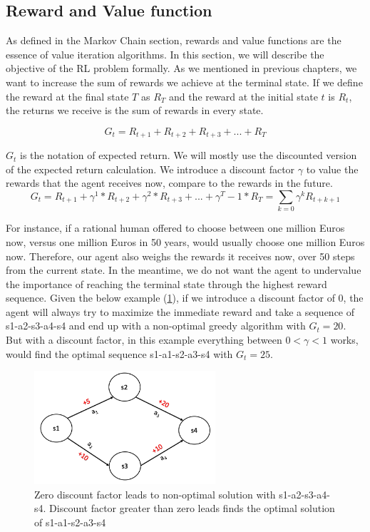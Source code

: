 \subsection{Reward and Value function}

As defined in the Markov Chain section, rewards and value functions are the essence of value iteration algorithms. In this section, we will describe the objective of the RL problem formally. As we mentioned in previous chapters, we want to increase the sum of rewards we achieve at the terminal state. If we define the reward at the final state \(T\) as \(R_T\) and the reward at the initial state \(t\) is \(R_t\), the returns we receive is the sum of rewards in every state.

\begin{equation}
    G_t = R_{t+1} + R_{t+2} + R_{t+3} + ... + R_T    
\end{equation}


\(G_t\) is the notation of expected return. We will mostly use the discounted version of the expected return calculation. We introduce a discount factor \(\gamma\) to value the rewards that the agent receives now, compare to the rewards in the future. 
\begin{equation}
    G_t = R_{t+1} + \gamma^1*R_{t+2} + \gamma^2*R_{t+3} + ... + \gamma^T-1*R_T = \sum\limits_{k=0}\gamma^kR_{t+k+1}
\end{equation}

For instance, if a rational human offered to choose between one million Euros now, versus one million Euros in 50 years, would usually choose one million Euros now. Therefore, our agent also weighs the rewards it receives now, over 50 steps from the current state.  In the meantime, we do not want the agent to undervalue the importance of reaching the terminal state through the highest reward sequence.  Given the below example (\ref{fig: nonoptimal}), if we introduce a discount factor of 0, the agent will always try to maximize the immediate reward and take a sequence of s1-a2-s3-a4-s4 and end up with a non-optimal greedy algorithm with \(G_t = 20 \). But with a discount factor, in this example everything between \(0< \gamma < 1\) works, would find the optimal sequence  s1-a1-s2-a3-s4 with \(G_t = 25\).

\begin{figure}[!htbp]
    \centering
    \includegraphics[width=0.6\textwidth]{figures/nonoptimal}
    \caption{Zero discount factor leads to non-optimal solution with s1-a2-s3-a4-s4. Discount factor greater than zero leads finds the optimal solution of s1-a1-s2-a3-s4 }
    \label{fig: nonoptimal}
\end{figure}

